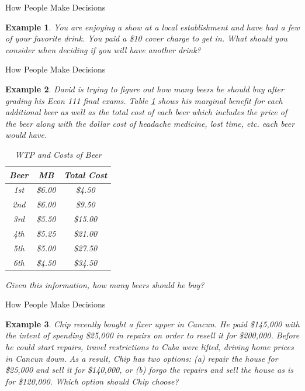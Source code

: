 \documentclass[xcolor={dvipsnames},pdf, hyperref={colorlinks=true, citecolor=ForestGreen, linkcolor=BlueViolet, urlcolor=Magenta}]{beamer}
\newtheorem{exmp}{Example}[section]
\newcommand{\ddp}[1]{{\textcolor{ForestGreen}{#1}}}
\begin{document}
\begin{frame}{How People Make Decisions}
\begin{exmp}
	You are enjoying a show at a local establishment and have had a few of your favorite drink. You paid a \$10 cover charge to get in. What should you consider when deciding if you will have another drink?
\end{exmp}
\pause \ddp{Sunk cost: cover charge already paid.\\
	Marginal benefit: Enjoyment/happiness from your drink.\\ 
	Marginal costs: Actual cost of the drink, any negative side effects
	\\ As long as $MB \ge MC$, drink up.}
\end{frame}

\begin{frame}{How People Make Decisions}
\begin{exmp}
	\scriptsize
David is trying to figure out how many beers he should buy after grading his Econ 111 final exams. Table \ref{tab5} shows his marginal benefit for each additional beer as well as the total cost of each beer which includes the price of the beer along with the dollar cost of headache medicine, lost time, etc. each beer would have. 
\begin{table}[H]
	\caption{WTP and Costs of Beer}
	\label{tab5}
	\centering
	\begin{tabular}{ c|c|c} 
		
		Beer & MB & Total Cost \\
		\hline
		1st & \$6.00 & \$4.50  \\
		2nd & \$6.00 & \$9.50 \\
		3rd & \$5.50 & \$15.00 \\
		4th & \$5.25 & \$21.00\\
		5th & \$5.00 & \$27.50  \\
		6th & \$4.50 & \$34.50 \\
	\end{tabular}
\end{table}	
Given this information, how many beers should he buy?	
\end{exmp}
\pause \ddp{Optimal amount is where $MB = MC =\$5.50$ at $Q=3$.}
\end{frame}

\begin{frame}{How People Make Decisions}
\begin{exmp} 
	Chip recently bought a fixer upper in Cancun. He paid \$145,000 with the intent of spending \$25,000 in repairs on order to resell it for \$200,000. Before he could start repairs, travel restrictions to Cuba were lifted, driving home prices in Cancun down. As a result, Chip has two options: (a) repair the house for \$25,000 and sell it for \$140,000, or (b) forgo the repairs and sell the house as is for \$120,000. Which option should Chip choose?
\end{exmp}
\pause \ddp{Sunk cost: \$145K. 
	\\ Option A: \$140K - 25K = \$115 gain.
	\\ Option B: \$120K gain. 
	\\ Chip should choose Choose option B.}
\end{frame}
\end{document}
